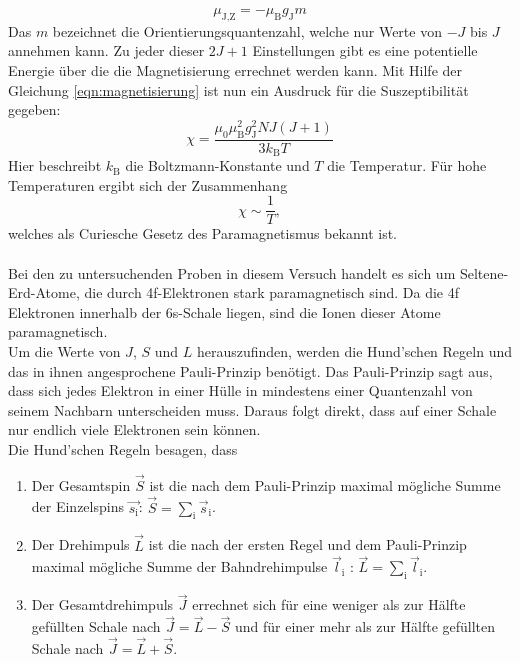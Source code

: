 \begin{equation*}
    \mu_{\text{J},\text{Z}} = - \mu_{\text{B}} g_{\text{J}} m 
\end{equation*}
Das $m$ bezeichnet die Orientierungsquantenzahl, welche nur Werte von $-J$ bis $J$ annehmen kann. 
Zu jeder dieser $2J+1$ Einstellungen gibt es eine potentielle Energie über die die Magnetisierung errechnet werden kann. 
Mit Hilfe der Gleichung \eqref{eqn:magnetisierung} ist nun ein Ausdruck für die Suszeptibilität gegeben:
\begin{equation} \label{eqn:sus_theo}
    \chi = \frac{\mu_0 \mu_{\text{B}}^2 g_{\text{J}}^2 N J (J+1)}{3 k_{\text{B}} T}
\end{equation}
Hier beschreibt $k_{\text{B}}$ die Boltzmann-Konstante und $T$ die Temperatur.
Für hohe Temperaturen ergibt sich der Zusammenhang 
\begin{equation*}
    \chi \sim \frac{1}{T},
\end{equation*}
welches als Curiesche Gesetz des Paramagnetismus bekannt ist.\\
\\
Bei den zu untersuchenden Proben in diesem Versuch handelt es sich um Seltene-Erd-Atome, die durch 4f-Elektronen stark paramagnetisch sind.
Da die 4f Elektronen innerhalb der 6s-Schale liegen, sind die Ionen dieser Atome paramagnetisch.\\
Um die Werte von $J$, $S$ und $L$ herauszufinden, werden die Hund'schen Regeln und das in ihnen angesprochene Pauli-Prinzip benötigt.
Das Pauli-Prinzip sagt aus, dass sich jedes Elektron in einer Hülle in mindestens einer Quantenzahl von seinem Nachbarn unterscheiden muss.
Daraus folgt direkt, dass auf einer Schale nur endlich viele Elektronen sein können.\\
Die Hund'schen Regeln besagen, dass
\begin{enumerate}
    \item Der Gesamtspin $\vec{S}$ ist die nach dem Pauli-Prinzip maximal mögliche Summe der Einzelspins $\vec{s_{\text{i}}}$: $\vec{S} = \sum_{\text{i}} \vec{s}_{\text{i}}$.
    \item Der Drehimpuls $\vec{L}$ ist die nach der ersten Regel und dem Pauli-Prinzip maximal mögliche Summe der Bahndrehimpulse $\vec{l}_{\text{i}}$ : $\vec{L} = \sum_{\text{i}} \vec{l}_{\text{i}}$.
    \item Der Gesamtdrehimpuls $\vec{J}$ errechnet sich für eine weniger als zur Hälfte gefüllten Schale nach $\vec{J} = \vec{L} - \vec{S}$ und für einer mehr als zur Hälfte gefüllten Schale nach $\vec{J} = \vec{L} + \vec{S}$.
\end{enumerate}

